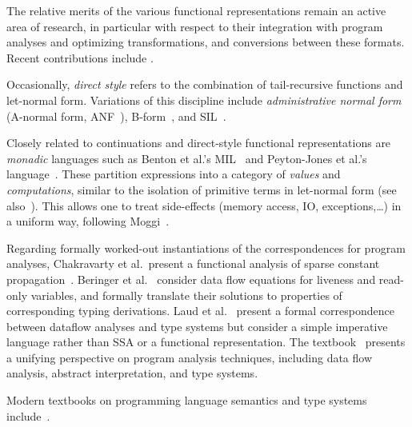 The relative merits of the various functional representations remain
an active area of research, in particular with respect to their
integration with program analyses and optimizing transformations, and
conversions between these formats. Recent contributions include
\cite{DBLP:journals/jfp/DanvyMN07,DBLP:journals/lisp/Reppy02,DBLP:conf/icfp/Kennedy07}.

Occasionally, \emph{direct style} refers to the combination of
tail-recursive functions and let-normal form. Variations of this
discipline include
\emph{administrative normal form} (A-normal form, ANF~\cite{DBLP:conf/pldi/FlanaganSDF93}), B-form~\cite{DBLP:conf/pldi/TarditiMCSHL96}, and SIL~\cite{DBLP:journals/jfp/TolmachO98}. 

Closely related to continuations and direct-style functional
representations are \emph{monadic} languages such as Benton et al.'s
MIL~\cite{BentonKennedyRussel:ICFP1998} and Peyton-Jones et al.'s
language~\cite{PeytonJonesShieldsLT:POPL1998}. These partition
expressions into a category of \emph{values} and \emph{computations},
similar to the isolation of primitive terms in let-normal form (see
also~\cite{Reynolds1974,Plotkin75}). This allows one to treat
side-effects (memory access, IO, exceptions,\ldots) in a uniform way,
following Moggi~\cite{Moggi1991}.

Regarding formally worked-out instantiations of the correspondences
for program analyses, Chakravarty et al.~present a functional analysis
of sparse constant propagation~\cite{ChakravartyKZ:COCV03}. Beringer
et al.~\cite{DBLP:journals/entcs/BeringerMS03} consider data flow
equations for liveness and read-only variables, and formally translate
their solutions to properties of corresponding typing
derivations. Laud et al.~\cite{DBLP:journals/tcs/LaudUV06} present a
formal correspondence between dataflow analyses and type systems but
consider a simple imperative language rather than SSA or a functional
representation. The textbook~\cite{NielsonNielsonHanking:POPA}
presents a unifying perspective on program analysis techniques,
including data flow analysis, abstract interpretation, and type
systems.

Modern textbooks on programming language semantics and type systems
include~\cite{winskel_93_formal,GunterBook,PierceTAPL}.

%
%
